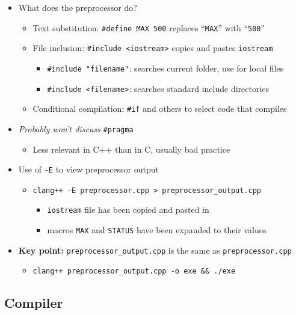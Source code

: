 \documentclass{article}
\begin{document}
\begin{itemize}
	\item What does the preprocessor do? \begin{itemize}
		\item Text substitution: \texttt{\#define MAX 500} replaces ``\texttt{MAX}'' with ``\texttt{500}''
		\item File inclusion: \texttt{\#include <iostream>} copies and pastes \texttt{iostream}
		\begin{itemize}
			\item \texttt{\#include "filename"}: searches current folder, use for local files
			\item \texttt{\#include <filename>}: searches standard include directories
		\end{itemize}
		\item Conditional compilation: \texttt{\#if} and others to select code that compiles
		
	\end{itemize}
	\item \textit{Probably won't discuss} \texttt{\#pragma}
	\begin{itemize}
		\item Less relevant in C++ than in C, usually bad practice
	\end{itemize}
	\item Use of \texttt{-E} to view preprocessor output \begin{itemize}
		\item \texttt{clang++ -E preprocessor.cpp > preprocessor\_output.cpp} \begin{itemize}
			\item \texttt{iostream} file has been copied and pasted in
			\item macros \texttt{MAX} and \texttt{STATUS} have been expanded to their values
		\end{itemize}
	\end{itemize}
	\item \textbf{Key point:} \texttt{preprocessor\_output.cpp} is the same as \texttt{preprocessor.cpp} \begin{itemize}
		\item \texttt{clang++ preprocessor\_output.cpp -o exe \&\& ./exe}
	\end{itemize}
\end{itemize}

\subsection{Compiler}
\end{document}
